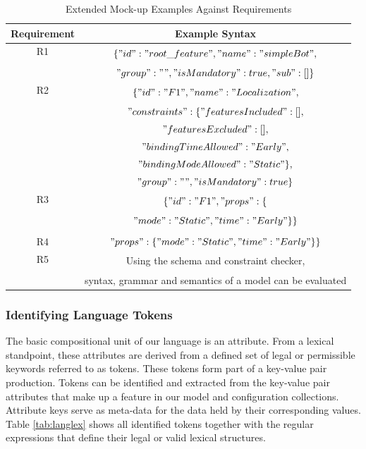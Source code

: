 \documentclass[conference]{IEEEtran}
\begin{document}
\begin{table}[H]
\caption{Extended Mock-up Examples Against Requirements}
\begin{center}
\begin{tabular}{c c}
\hline
    Requirement & Example Syntax  \\ \hline
     R1 & \multirow{2}{*}{$\{"id":"root\_feature","name":"simpleBot",$}\\
                        & \\
                        & $"group": "","isMandatory": true,"sub": []\}$\\ \hline
     R2 & \multirow{2}{*}{$\{"id": "F1","name": "Localization",$}\\ 
                        & \\
                        & $"constraints": \{"featuresIncluded": [],$\\ 
                        & $"featuresExcluded": [],$\\
                        &$"bindingTimeAllowed":"Early",$ \\
                        & $"bindingModeAllowed":"Static"\},$\\ 
                        & $"group": "","isMandatory": true\}$ \\
                         \hline
     R3 &  \multirow{2}{*}{$\{"id": "F1","props": \{$}\\
            & \\
            & $"mode": "Static","time": "Early"\}\}$\\
            & \\
            \hline
     R4 & $"props": \{"mode": "Static","time": "Early"\}\}$\\ \hline
     R5 & \multirow{2}{*}{Using the schema and constraint checker,}\\ 
        & \\
        & syntax, grammar and semantics of a model can be evaluated\\ \hline
\end{tabular}
\label{tab:reqext}
\end{center}
\end{table}

\subsubsection{Identifying Language Tokens}
The basic compositional unit of our language is an attribute. From a lexical standpoint, these attributes are derived from a defined set of legal or permissible keywords referred to as tokens. These tokens form part of a key-value pair production. Tokens can be identified and extracted from the key-value pair attributes that make up a feature in our model and configuration collections. Attribute keys serve as meta-data for the data held by their corresponding values. Table \ref{tab:langlex} shows all identified tokens together with the regular expressions that define their legal or valid lexical structures.
\end{document}

